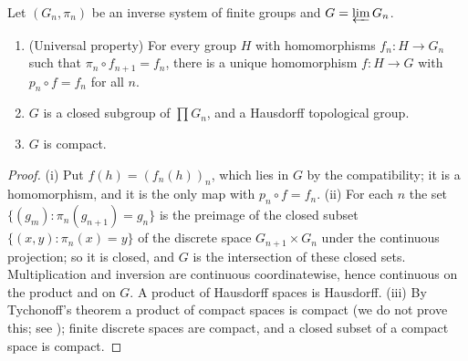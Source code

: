 \begin{proposition}\label{prop:groups:inverselimit}
Let $(G_n,\pi_n)$ be an inverse system of finite groups and $G=\varprojlim G_n$.
\begin{enumerate}[label=(\roman*)]
\item (Universal property) For every group $H$ with homomorphisms $f_n\colon H\to G_n$ such that $\pi_n\circ f_{n+1}=f_n$, there is a unique homomorphism $f\colon H\to G$ with
$p_n\circ f=f_n$ for all $n$.
\item $G$ is a closed subgroup of $\prod G_n$, and a Hausdorff topological group.
\item $G$ is compact.
\end{enumerate}
\end{proposition}

\begin{proof}
(i) Put $f(h)=(f_n(h))_n$, which lies in $G$ by the compatibility; it is a homomorphism, and it is the only map with $p_n\circ f=f_n$. (ii) For each $n$ the set
$\{(g_m):\pi_n(g_{n+1})=g_n\}$ is the preimage of the closed subset $\{(x,y):\pi_n(x)=y\}$ of the discrete space $G_{n+1}\times G_n$ under the continuous projection; so it is
closed, and $G$ is the intersection of these closed sets. Multiplication and inversion are continuous coordinatewise, hence continuous on the product and on $G$. A
product of Hausdorff spaces is Hausdorff. (iii) By Tychonoff's theorem a product of compact spaces is compact (we do not prove this; see
\cite[Theorem 37.3]{Munkres00}); finite discrete spaces are compact, and a closed subset of a compact space is compact.
\end{proof}

